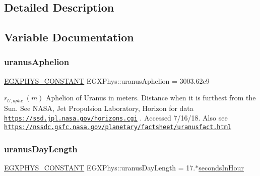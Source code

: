 \subsection{Detailed Description}


\subsection{Variable Documentation}
\mbox{\label{group___e_g_x_phys-_constants-_astrophysics-_solar_system-_uranus-_orbit_ga84192253ce5270f031af0d81e04556d8}} 
\subsubsection{\texorpdfstring{uranus\+Aphelion}{uranusAphelion}}
{\footnotesize\ttfamily \mbox{\hyperlink{group___e_g_x_phys-_constants-_macros_ga76980d288494ce1714c9ac68a95ba702}{E\+G\+X\+P\+H\+Y\+S\+\_\+\+C\+O\+N\+S\+T\+A\+NT}} E\+G\+X\+Phys\+::uranus\+Aphelion = 3003.\+62e9}

$ r_{U,aphe} \ (m)$ Aphelion of Uranus in meters. Distance when it is furthest from the Sun. See N\+A\+SA, Jet Propulsion Laboratory, Horizon for data \href{https://ssd.jpl.nasa.gov/horizons.cgi}{\tt https\+://ssd.\+jpl.\+nasa.\+gov/horizons.\+cgi} . Accessed 7/16/18. Also see \href{https://nssdc.gsfc.nasa.gov/planetary/factsheet/uranusfact.html}{\tt https\+://nssdc.\+gsfc.\+nasa.\+gov/planetary/factsheet/uranusfact.\+html} \mbox{\label{group___e_g_x_phys-_constants-_astrophysics-_solar_system-_uranus-_orbit_ga1423b9fa4a1d206050effb23df605ff5}} 
\subsubsection{\texorpdfstring{uranus\+Day\+Length}{uranusDayLength}}
{\footnotesize\ttfamily \mbox{\hyperlink{group___e_g_x_phys-_constants-_macros_ga76980d288494ce1714c9ac68a95ba702}{E\+G\+X\+P\+H\+Y\+S\+\_\+\+C\+O\+N\+S\+T\+A\+NT}} E\+G\+X\+Phys\+::uranus\+Day\+Length = 17.$\ast$\mbox{\hyperlink{namespace_e_g_x_phys_a7c3165cd93e36f1fb8e9fef80f117bef}{seconds\+In\+Hour}}}

